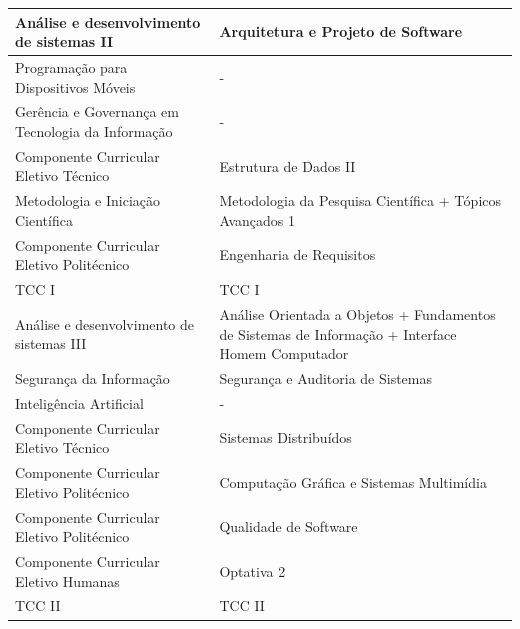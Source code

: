 \documentclass[11pt,fleqn]{book} %
\begin{document}
\begin{table}[H]
{\begin{tabular}{|l|l|}
			Análise e desenvolvimento de sistemas II  & Arquitetura e Projeto de Software                                                                \\ \hline
			Programação para Dispositivos Móveis      & -                                                                                                \\ \hline
			Gerência e Governança em Tecnologia da Informação                & -                                                                                                \\ \hline
			Componente Curricular Eletivo Técnico     & Estrutura de Dados II                                                                            \\ \hline
			Metodologia e Iniciação Científica        & Metodologia da Pesquisa Científica + Tópicos Avançados 1                                         \\ \hline
			Componente Curricular Eletivo Politécnico & Engenharia de Requisitos                                                                         \\ \hline
			TCC I                                     & TCC I                                                                                            \\ \hline
			Análise e desenvolvimento de sistemas III & Análise Orientada a Objetos + Fundamentos de Sistemas de Informação + Interface Homem Computador \\ \hline
			Segurança da Informação                   & Segurança e Auditoria de Sistemas                                                                \\ \hline
			Inteligência Artificial                   & -                                                                                                \\ \hline
			Componente Curricular Eletivo Técnico     & Sistemas Distribuídos                                                                            \\ \hline
			Componente Curricular Eletivo Politécnico & Computação Gráfica e Sistemas Multimídia                                                         \\ \hline
			Componente Curricular Eletivo Politécnico & Qualidade de Software                                                                            \\ \hline
			Componente Curricular Eletivo Humanas     & Optativa 2                                                                                       \\ \hline
			TCC II                                    & TCC II                                                                                           \\ \hline
		\end{tabular}%
	}
\end{table}
\end{document}
